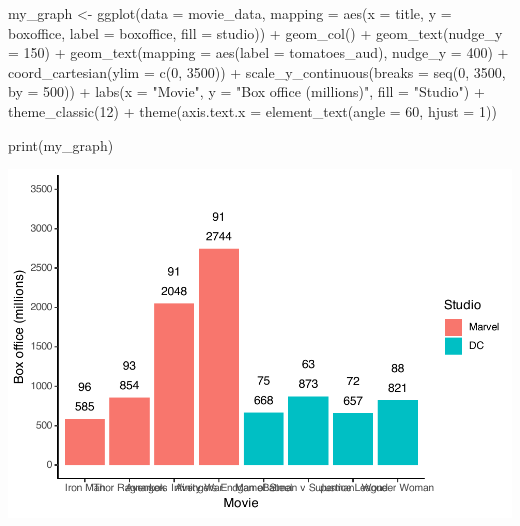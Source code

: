 \documentclass[
]{krantz}
\makeatletter
\newenvironment{Shaded}{\begin{snugshade}}{\end{snugshade}}
\newcommand{\AttributeTok}[1]{\textcolor[rgb]{0.61,0.61,0.61}{#1}}
\newcommand{\DecValTok}[1]{\textcolor[rgb]{0.06,0.06,0.06}{#1}}
\newcommand{\FunctionTok}[1]{\textcolor[rgb]{0,0,0}{#1}}
\newcommand{\NormalTok}[1]{#1}
\newcommand{\OtherTok}[1]{\textcolor[rgb]{0.37,0.37,0.37}{#1}}
\newcommand{\SpecialCharTok}[1]{\textcolor[rgb]{0,0,0}{#1}}
\newcommand{\StringTok}[1]{\textcolor[rgb]{0.5,0.5,0.5}{#1}}
\newenvironment{kframe}{%
\medskip{}
\setlength{\fboxsep}{.8em}
 \def\at@end@of@kframe{}%
 \ifinner\ifhmode%
  \def\at@end@of@kframe{\end{minipage}}%
  \begin{minipage}{\columnwidth}%
 \fi\fi%
 \def\FrameCommand##1{\hskip\@totalleftmargin \hskip-\fboxsep
 \colorbox{shadecolor}{##1}\hskip-\fboxsep
     \hskip-\linewidth \hskip-\@totalleftmargin \hskip\columnwidth}%
 \MakeFramed {\advance\hsize-\width
   \@totalleftmargin\z@ \linewidth\hsize
   \@setminipage}}%
 {\par\unskip\endMakeFramed%
 \at@end@of@kframe}
\renewenvironment{Shaded}{\begin{kframe}}{\end{kframe}}
\makeatother
\begin{document}
\begin{Shaded}
\begin{Highlighting}[]
\NormalTok{my\_graph }\OtherTok{\textless{}{-}} \FunctionTok{ggplot}\NormalTok{(}\AttributeTok{data =}\NormalTok{ movie\_data,}
           \AttributeTok{mapping =} \FunctionTok{aes}\NormalTok{(}\AttributeTok{x =}\NormalTok{ title,}
                         \AttributeTok{y =}\NormalTok{ boxoffice,}
                         \AttributeTok{label =}\NormalTok{ boxoffice, }
                         \AttributeTok{fill =}\NormalTok{ studio)) }\SpecialCharTok{+}
  \FunctionTok{geom\_col}\NormalTok{() }\SpecialCharTok{+}
  \FunctionTok{geom\_text}\NormalTok{(}\AttributeTok{nudge\_y =} \DecValTok{150}\NormalTok{)  }\SpecialCharTok{+}
  \FunctionTok{geom\_text}\NormalTok{(}\AttributeTok{mapping =} \FunctionTok{aes}\NormalTok{(}\AttributeTok{label =}\NormalTok{ tomatoes\_aud), }
            \AttributeTok{nudge\_y =} \DecValTok{400}\NormalTok{) }\SpecialCharTok{+}
  \FunctionTok{coord\_cartesian}\NormalTok{(}\AttributeTok{ylim =} \FunctionTok{c}\NormalTok{(}\DecValTok{0}\NormalTok{, }\DecValTok{3500}\NormalTok{)) }\SpecialCharTok{+}
  \FunctionTok{scale\_y\_continuous}\NormalTok{(}\AttributeTok{breaks =} \FunctionTok{seq}\NormalTok{(}\DecValTok{0}\NormalTok{, }\DecValTok{3500}\NormalTok{, }\AttributeTok{by =} \DecValTok{500}\NormalTok{)) }\SpecialCharTok{+}
  \FunctionTok{labs}\NormalTok{(}\AttributeTok{x =} \StringTok{"Movie"}\NormalTok{,}
       \AttributeTok{y =} \StringTok{"Box office (millions)"}\NormalTok{,}
       \AttributeTok{fill =} \StringTok{"Studio"}\NormalTok{) }\SpecialCharTok{+}
  \FunctionTok{theme\_classic}\NormalTok{(}\DecValTok{12}\NormalTok{) }\SpecialCharTok{+}
  \FunctionTok{theme}\NormalTok{(}\AttributeTok{axis.text.x =} \FunctionTok{element\_text}\NormalTok{(}\AttributeTok{angle =} \DecValTok{60}\NormalTok{, }
                                   \AttributeTok{hjust =} \DecValTok{1}\NormalTok{))  }

\FunctionTok{print}\NormalTok{(my\_graph)}
\end{Highlighting}
\end{Shaded}

\includegraphics[width=0.65\linewidth]{bookdown_files/figure-latex/unnamed-chunk-128-1}
\end{document}
